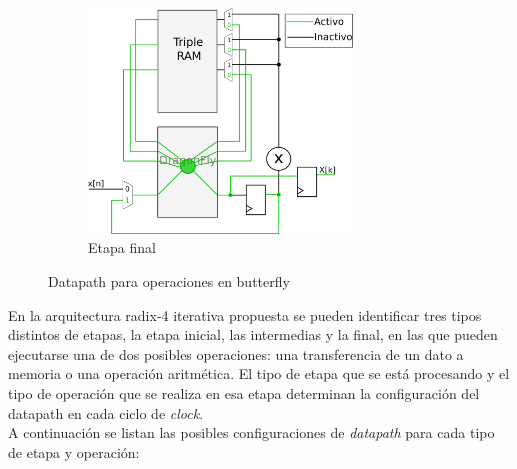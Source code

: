\begin{figure}[htb!]
\begin{subfigure}{\columnwidth}
        \includegraphics[width=7cm]{./figures/datapathR4_arit_fin.png}
        \caption{Etapa final}
        \end{subfigure}
        \caption{Datapath para operaciones en butterfly}
        \label{fig:datapathAritR4}
\end{figure}

En la arquitectura radix-4 iterativa propuesta se pueden identificar tres tipos distintos de etapas,
la etapa inicial, las intermedias y la final, en las que pueden ejecutarse una de dos posibles
operaciones: una transferencia de un dato a memoria o una operación aritmética. El tipo de etapa
que se está procesando y el tipo de operación que se realiza en esa etapa determinan la
configuración del datapath en cada ciclo de \textit{clock}.\\

A continuación se listan las posibles configuraciones de \textit{datapath} para cada tipo de etapa y
operación:

